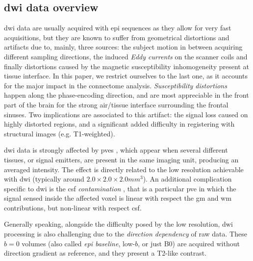 \subsection{\gls{dwi} data overview}
\label{sec:dwi_overview}


\gls{dwi} data are usually acquired with \gls{epi} sequences 
as they allow for very fast acquisitions, but they are known to 
suffer from geometrical distortions and artifacts due to, mainly,
three sources: the subject motion in between acquiring different
sampling directions, the induced \emph{Eddy currents} on the scanner 
coils and finally distortions caused by the magnetic susceptibility inhomogeneity
present at tissue interface. In this paper, we restrict ourselves to
the last one, as it accounts for the major impact in the connectome
analysis. \emph{Susceptibility distortions} happen along the 
phase-encoding direction, and are most appreciable in the front part of 
the brain for the strong air/tissue interface surrounding the frontal sinuses.
Two implications are associated to this artifact: the signal loss caused on
highly distorted regions, and a significant added difficulty in 
registering with structural images (e.g. T1-weighted).

\gls{dwi} data is strongly affected by \glspl{pve} \citep{alexander_analysis_2001},
which appear when several different tissues, or signal emitters, are present
in the same imaging unit, producing an averaged intensity. The effect is directly
related to the low resolution achievable with \gls{dwi} (typically around 
$2.0\times2.0\times2.0mm^3$). An additional complication specific to
\gls{dwi} is the \gls{csf} \emph{contamination} \citep{metzler-baddeley_how_2012},
that is a particular \gls{pve} in which the signal sensed inside the affected voxel is 
linear with respect the \gls{gm} and \gls{wm} contributions, but non-linear with
respect \gls{csf}.

Generally speaking, alongside the difficulty posed by the low resolution, \gls{dwi} 
processing is also challenging due to the \emph{direction dependency} of raw data.
These $b = 0$ volumes (also called \emph{\gls{epi} baseline}, low-$b$, or just B0) 
are acquired without direction gradient as reference, and they present a T2-like 
contrast.



